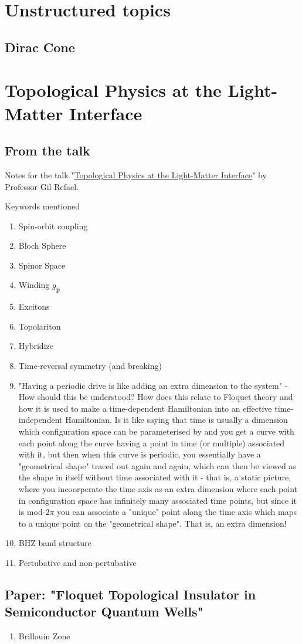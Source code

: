 \documentclass[a4paper]{article}
\begin{document}
    \section{Unstructured topics}
    \subsection{Dirac Cone}
    
    \section{Topological Physics at the Light-Matter Interface}
    \subsection{From the talk}
    Notes for the talk "\href{https://www.youtube.com/watch?v=LjHlAO46i0c&t=0s&ab_channel=AspenPhysics}{Topological Physics at the Light-Matter Interface}" by Professor Gil Refael.

    Keywords mentioned
    \begin{enumerate}
        \item Spin-orbit coupling
        \item Bloch Sphere
        \item Spinor Space
        \item Winding \(g_{\mathbf{p}}\) 
        \item Excitons
        \item Topolariton
        \item Hybridize
        \item Time-reversal symmetry (and breaking)
        \item "Having a periodic drive is like adding an extra dimension to the system" - How should this be understood? How does this relate to Floquet theory and how it is used to make a time-dependent Hamiltonian into an effective time-independent Hamiltonian. Is it like saying that time is usually a dimension which configuration space can be parameterised by and you get a curve with each point along the curve having a point in time (or multiple) associated with it, but then when this curve is periodic, you essentially have a "geometrical shape" traced out again and again, which can then be viewed as the shape in itself without time associated with it - that is, a static picture, where you incoorperate the time axis as an extra dimension where each point in configuration space has infinitely many associated time points, but since it is mod-\(2\pi\) you can associate a "unique" point along the time axis which maps to a unique point on the "geometrical shape". That is, an extra dimension!
        \item BHZ band structure
        \item Pertubative and non-pertubative
    \end{enumerate}

    \subsection{Paper: "Floquet Topological Insulator in Semiconductor Quantum Wells"}
    \begin{enumerate}
        \item Brillouin Zone
    \end{enumerate}
    
\end{document}
